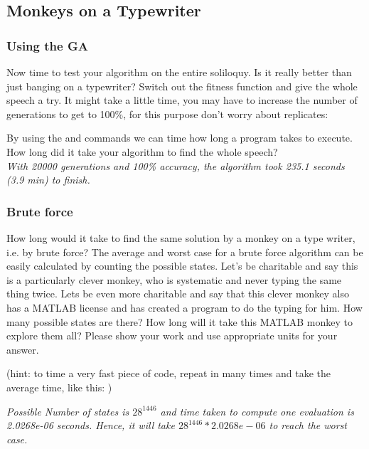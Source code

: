 \documentclass{article}
\begin{document}
\newpage
\subsection{Monkeys on a Typewriter}
\subsubsection{Using the GA}
Now time to test your algorithm on the entire soliloquy. Is it really better than just banging on a typewriter? Switch out the fitness function and give the whole speech a try. It might take a little time, you may have to increase the number of generations to get to 100\%, for this purpose don't worry about replicates:



By using the  and  commands we can time how long a program takes to execute. How long did it take your algorithm to find the whole speech?\\
\textit{
\color{red} With 20000 generations and 100\% accuracy, the algorithm took 235.1 seconds (3.9 min)  to finish.
}

\newpage
\subsubsection{Brute force}
How long would it take to find the same solution by a monkey on a type writer, i.e. by brute force? The average and worst case for a brute force algorithm can be easily calculated by counting the possible states. Let's be charitable and say this is a particularly clever monkey, who is systematic and never typing the same thing twice. Lets be even more charitable and say that this clever monkey also has a MATLAB license and has created a program to do the typing for him. How many possible states are there? How long will it take this MATLAB monkey to explore them all? Please show your work and use appropriate units for your answer.

(hint: to time a very fast piece of code, repeat in many times and take the average time, like this: )



\textit{
\color{blue}Possible Number of states is $28^{1446}$ and time taken to compute one evaluation is 2.0268e-06 seconds. Hence, it will take $28^{1446} * 2.0268e-06$ to reach the worst case.
}
\end{document}
